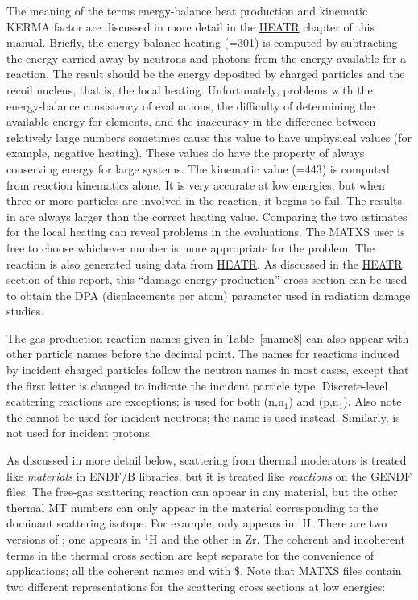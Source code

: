 \noindent
The meaning of the terms energy-balance heat production and kinematic
KERMA factor are discussed in more detail in the
\hyperlink{sHEATRhy}{HEATR} chapter of this
manual.  Briefly, the
energy-balance heating (=301) is computed by subtracting the
energy carried away by neutrons and photons from the
energy available for a reaction.  The result should be the energy
deposited by charged particles and the recoil nucleus, that is, the
local heating.  Unfortunately, problems with the energy-balance
consistency of evaluations, the difficulty of determining the
available energy for elements, and the inaccuracy in the difference
between relatively large numbers sometimes cause this value to have
unphysical values (for example, negative heating).  These values do
have the property of always conserving energy for large systems.  The
kinematic value (=443) is computed from reaction kinematics alone.
It is very accurate at low energies, but when three or more particles
are involved in the reaction, it begins to fail.  The results in
 are always larger than the correct heating value.
Comparing the two estimates for the local heating can reveal problems
in the evaluations\cite{ebal,KAOS5}.  The MATXS user is free to
choose whichever number is more appropriate for the problem. The
reaction  is also generated using data from
\hyperlink{sHEATRhy}{HEATR}.  As discussed in the
\hyperlink{sHEATRhy}{HEATR} section of this report, this ``damage-energy
production'' cross section can be used to obtain the DPA
(displacements per atom) parameter used in radiation damage studies.

The gas-production reaction names given in Table~\ref{sname8} can
also appear with other particle names before the decimal point.  The
names for reactions induced by incident charged particles follow the
neutron names in most cases, except that the first letter is changed to
indicate the incident particle type.  Discrete-level scattering
reactions are exceptions;  is used for both (n,n$_1$)
and (p,n$_1$).  Also note the  cannot be used for
incident neutrons; the name  is used instead.  Similarly,
 is not used for incident protons.

As discussed in more detail below, scattering from thermal moderators
is treated like {\it materials} in ENDF/B libraries, but it is treated
like {\it reactions} on the GENDF files.  The free-gas scattering
reaction can appear in any material, but the other thermal MT numbers
can only appear in the material corresponding to the dominant
scattering isotope.  For example,  only appears in $^{1}$H.
There are two versions of ; one appears in $^{1}$H and the
other in Zr.   The coherent and incoherent terms in the thermal
cross section are kept separate for the convenience of applications;
all the coherent names  end with \$.  Note that MATXS files contain
two different representations for the scattering cross sections at
low energies:

